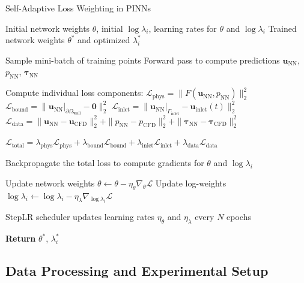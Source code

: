 \documentclass[12pt, a4paper]{article}
\begin{document}
\begin{algorithm}[htbp]
    \caption{Self-Adaptive Loss Weighting in PINNs}
    \label{alg:self_adaptive_weighting}
    \begin{algorithmic}[1]
    \Require Initial network weights $\theta$, initial $\log \lambda_i$, learning rates for $\theta$ and $\log \lambda_i$
    \Ensure Trained network weights $\theta^*$ and optimized $\lambda_i^*$
    
        \State Sample mini-batch of training points
        \State Forward pass to compute predictions $\mathbf{u}_{\mathrm{NN}}$, $p_{\mathrm{NN}}$, $\boldsymbol{\tau}_{\mathrm{NN}}$
        
        \State Compute individual loss components:
            \State \quad $\mathcal{L}_{\mathrm{phys}} = \|F(\mathbf{u}_{\mathrm{NN}}, p_{\mathrm{NN}})\|_2^2$
            \State \quad $\mathcal{L}_{\mathrm{bound}} = \|\mathbf{u}_{\mathrm{NN}}|_{\partial\Omega_{\mathrm{wall}}} - \mathbf{0}\|_2^2$
            \State \quad $\mathcal{L}_{\mathrm{inlet}} = \|\mathbf{u}_{\mathrm{NN}}|_{\Gamma_{\mathrm{inlet}}} - \mathbf{u}_{\mathrm{inlet}}(t)\|_2^2$
            \State \quad $\mathcal{L}_{\mathrm{data}} = \|\mathbf{u}_{\mathrm{NN}} - \mathbf{u}_{\mathrm{CFD}}\|_2^2 + \|p_{\mathrm{NN}} - p_{\mathrm{CFD}}\|_2^2 + \|\boldsymbol{\tau}_{\mathrm{NN}} - \boldsymbol{\tau}_{\mathrm{CFD}}\|_2^2$
        
        \State \quad $\mathcal{L}_{\mathrm{total}} = \lambda_{\mathrm{phys}} \mathcal{L}_{\mathrm{phys}} + \lambda_{\mathrm{bound}} \mathcal{L}_{\mathrm{bound}} + \lambda_{\mathrm{inlet}} \mathcal{L}_{\mathrm{inlet}} + \lambda_{\mathrm{data}} \mathcal{L}_{\mathrm{data}}$
        
        \State Backpropagate the total loss to compute gradients for $\theta$ and $\log \lambda_i$
        
        \State Update network weights $\theta \gets \theta - \eta_{\theta} \nabla_{\theta} \mathcal{L}$
        \State Update log-weights $\log \lambda_i \gets \log \lambda_i - \eta_{\lambda} \nabla_{\log \lambda_i} \mathcal{L}$
        
        \State StepLR scheduler updates learning rates $\eta_{\theta}$ and $\eta_{\lambda}$ every $N$ epochs
    \EndWhile
    
    \State \textbf{Return} $\theta^*$, $\lambda_i^*$
    \end{algorithmic}
\end{algorithm}


\subsection{Data Processing and Experimental Setup}
\label{sec:data_processing}
\end{document}
